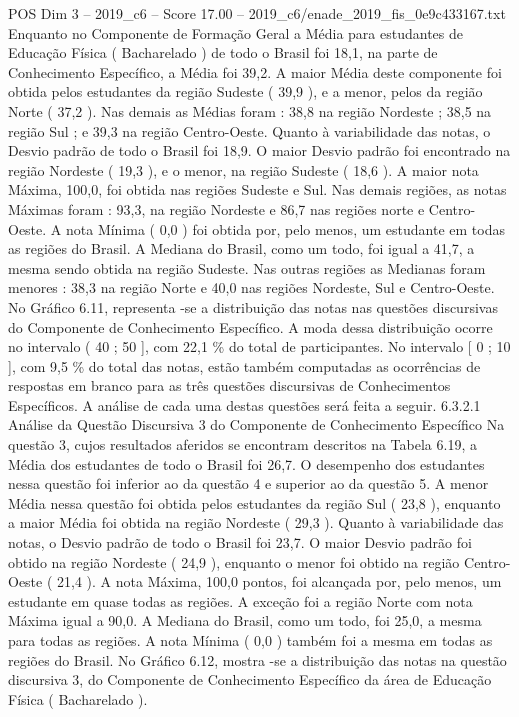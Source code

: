 \begin{textsample}{POS Dim 3 – 2019\_c6 – Score 17.00 – 2019\_c6/enade\_2019\_fis\_0e9c433167.txt}
Enquanto no Componente de Formação Geral a Média para estudantes de Educação Física ( Bacharelado ) de todo o Brasil foi 18,1, na parte de Conhecimento Específico, a Média foi 39,2.
A maior Média deste componente foi obtida pelos estudantes da região Sudeste ( 39,9 ), e a menor, pelos da região Norte ( 37,2 ).
Nas demais as Médias foram : 38,8 na região Nordeste ; 38,5 na região Sul ; e 39,3 na região Centro-Oeste.
Quanto à variabilidade das notas, o Desvio padrão de todo o Brasil foi 18,9.
O maior Desvio padrão foi encontrado na região Nordeste ( 19,3 ), e o menor, na região Sudeste ( 18,6 ).
A maior nota Máxima, 100,0, foi obtida nas regiões Sudeste e Sul.
Nas demais regiões, as notas Máximas foram : 93,3, na região Nordeste e 86,7 nas regiões norte e Centro-Oeste.
A nota Mínima ( 0,0 ) foi obtida por, pelo menos, um estudante em todas as regiões do Brasil.
A Mediana do Brasil, como um todo, foi igual a 41,7, a mesma sendo obtida na região Sudeste.
Nas outras regiões as Medianas foram menores : 38,3 na região Norte e 40,0 nas regiões Nordeste, Sul e Centro-Oeste.
No Gráfico 6.11, representa -se a distribuição das notas nas questões discursivas do Componente de Conhecimento Específico.
A moda dessa distribuição ocorre no intervalo ( 40 ; 50 ], com 22,1 \% do total de participantes.
No intervalo [ 0 ; 10 ], com 9,5 \% do total das notas, estão também computadas as ocorrências de respostas em branco para as três questões discursivas de Conhecimentos Específicos.
A análise de cada uma destas questões será feita a seguir. 6.3.2.1 Análise da Questão Discursiva 3 do Componente de Conhecimento Específico Na questão 3, cujos resultados aferidos se encontram descritos na Tabela 6.19, a Média dos estudantes de todo o Brasil foi 26,7.
O desempenho dos estudantes nessa questão foi inferior ao da questão 4 e superior ao da questão 5.
A menor Média nessa questão foi obtida pelos estudantes da região Sul ( 23,8 ), enquanto a maior Média foi obtida na região Nordeste ( 29,3 ).
Quanto à variabilidade das notas, o Desvio padrão de todo o Brasil foi 23,7.
O maior Desvio padrão foi obtido na região Nordeste ( 24,9 ), enquanto o menor foi obtido na região Centro-Oeste ( 21,4 ).
A nota Máxima, 100,0 pontos, foi alcançada por, pelo menos, um estudante em quase todas as regiões.
A exceção foi a região Norte com nota Máxima igual a 90,0.
A Mediana do Brasil, como um todo, foi 25,0, a mesma para todas as regiões.
A nota Mínima ( 0,0 ) também foi a mesma em todas as regiões do Brasil.
No Gráfico 6.12, mostra -se a distribuição das notas na questão discursiva 3, do Componente de Conhecimento Específico da área de Educação Física ( Bacharelado ).

\end{textsample}
